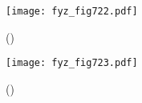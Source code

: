    \begin{figure}[ht!] %
      \centering
      \texttt{[image: fyz\_fig722.pdf]}
      \caption{
               (\cite[s.~707]{Feynman02})}
      \label{fyz_fig722}
    \end{figure}

    \begin{figure}[ht!] %
      \centering
      \texttt{[image: fyz\_fig723.pdf]}
      \caption{
               (\cite[s.~707]{Feynman02})}
      \label{fyz_fig723}
    \end{figure}


